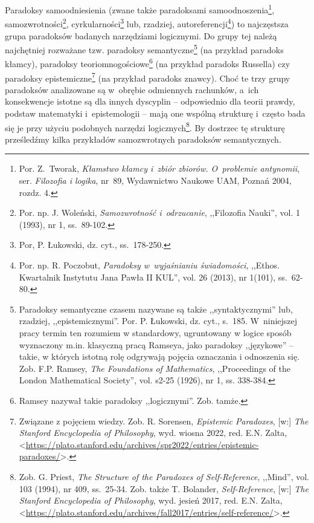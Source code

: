 Paradoksy samoodniesienia (zwane także paradoksami samoodnoszenia\footnote{Por. Z.~Tworak, \textit{Kłamstwo kłamcy i~zbiór zbiorów. O~problemie antynomii}, ser. \textit{Filozofia i logika}, nr~89, Wydawnictwo Naukowe UAM, Poznań 2004, rozdz. 4.}, samozwrotności\footnote{Por. np. J. Woleński, \textit{Samozwrotność i~odrzucanie}, ,,Filozofia Nauki'', vol. 1 (1993), nr 1, ss.~89-102.}, cyrkularności\footnote{Por, P. Łukowski, dz. cyt., ss.~178-250.} lub, rzadziej, autoreferencji\footnote{Por. np. R. Poczobut, \textit{Paradoksy w~wyjaśnianiu świadomości}, ,,Ethos. Kwartalnik Instytutu Jana Pawła II KUL'', vol. 26 (2013), nr 1(101), ss.~62-80.}) to najczęstsza grupa paradoksów badanych narzędziami logicznymi. Do grupy tej należą najchętniej rozważane tzw. paradoksy semantyczne\footnote{Paradoksy semantyczne czasem nazywane są także ,,syntaktycznymi'' lub, rzadziej, ,,epistemicznymi''. Por. P. Łukowski, dz. cyt., s.~185. W~niniejszej pracy termin ten rozumiem w standardowy, ugruntowany w logice sposób wyznaczony m.in. klasyczną pracą Ramseya, jako paradoksy ,,językowe'' -- takie, w których istotną rolę odgrywają pojęcia oznaczania i odnoszenia się. Zob. F.P. Ramsey, \textit{The Foundations of Mathematics}, ,,Proceedings of the London Mathematical Society'', vol. s2-25 (1926), nr 1, ss. 338-384.} (na przykład paradoks kłamcy), paradoksy teoriomnogościowe\footnote{Ramsey nazywał takie paradoksy ,,logicznymi''. Zob. tamże.} (na przykład paradoks Russella) czy paradoksy epistemiczne\footnote{Związane z pojęciem wiedzy. Zob. R. Sorensen, \textit{Epistemic Paradoxes}, [w:] \textit{The Stanford Encyclopedia of Philosophy}, wyd. wiosna 2022, red. E.N. Zalta, <\url{https://plato.stanford.edu/archives/spr2022/entries/epistemic-paradoxes/}>.} (na przykład paradoks znawcy). Choć te trzy grupy paradoksów analizowane są w~obrębie odmiennych rachunków, a~ich konsekwencje istotne są dla innych dyscyplin -- odpowiednio dla teorii prawdy, podstaw matematyki i~epistemologii -- mają one wspólną strukturę i~często bada się je przy użyciu podobnych narzędzi logicznych\footnote{Zob. G. Priest, \textit{The Structure of the Paradoxes of Self-Reference}, ,,Mind'', vol. 103 (1994), nr 409, ss.~25-34. Zob. także T. Bolander, \textit{Self-Reference}, [w:] \textit{The Stanford Encyclopedia of Philosophy}, wyd. jesień 2017, red. E.N. Zalta, {\textless}\url{https://plato.stanford.edu/archives/fall2017/entries/self-reference/}{\textgreater}.}. By dostrzec tę strukturę prześledźmy kilka przykładów samozwrotnych paradoksów semantycznych.

